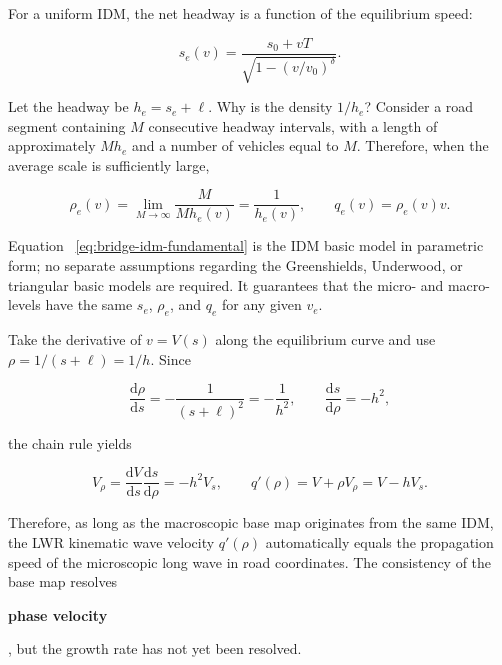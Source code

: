 \documentclass[11pt,a4paper,openany]{book}
\numberwithin{equation}{chapter}
\numberwithin{figure}{chapter}
\numberwithin{table}{chapter}
\begin{document}
For a uniform IDM, the net headway is a function of the equilibrium speed:

\begin{equation}
s_e(v)=\frac{s_0+vT}{\sqrt{1-(v/v_0)^\delta}}.
\label{eq:bridge-idm-gap}
\end{equation}

Let the headway be $h_e=s_e+\ell$. Why is the density $1/h_e$? Consider a road segment containing $M$ consecutive headway intervals, with a length of approximately $Mh_e$ and a number of vehicles equal to $M$. Therefore, when the average scale is sufficiently large,

\begin{equation}
\rho_e(v)=\lim_{M\to\infty}\frac{M}{Mh_e(v)}=\frac{1}{h_e(v)},
\qquad
q_e(v)=\rho_e(v)v.
\label{eq:bridge-idm-fundamental}
\end{equation}

Equation ~\eqref{eq:bridge-idm-fundamental} is the IDM basic model in parametric form; no separate assumptions regarding the Greenshields, Underwood, or triangular basic models are required. It guarantees that the micro- and macro-levels have the same $s_e$, $\rho_e$, and $q_e$ for any given $v_e$.




Take the derivative of $v=V(s)$ along the equilibrium curve and use $\rho=1/(s+\ell)=1/h$. Since

\begin{equation}
\frac{\mathrm d\rho}{\mathrm ds}=-\frac{1}{(s+\ell)^2}=-\frac1{h^2},
\qquad
\frac{\mathrm ds}{\mathrm d\rho}=-h^2,
\end{equation}

the chain rule yields

\begin{equation}
V_\rho
=\frac{\mathrm dV}{\mathrm ds}\frac{\mathrm ds}{\mathrm d\rho}
=-h^2V_s,
\qquad
q'(\rho)=V+\rho V_\rho=V-hV_s.
\label{eq:bridge-wave-speed}
\end{equation}

Therefore, as long as the macroscopic base map originates from the same IDM, the LWR kinematic wave velocity $q'(\rho)$ automatically equals the propagation speed of the microscopic long wave in road coordinates. The consistency of the base map resolves




\textbf{phase velocity}




, but the growth rate has not yet been resolved.
\end{document}
